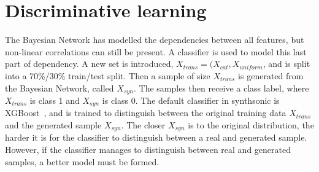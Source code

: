 \section{Discriminative learning}
The Bayesian Network has modelled the dependencies between all features, but non-linear correlations can still be present. A classifier is used to model this last part of dependency. A new set is introduced, $X_{trans} = (X_{cat},X_{uniform}$, and is split into a 70\%/30\% train/test split. Then a sample of size $X_{trans}$ is generated from the Bayesian Network, called $X_{syn}$. The samples then receive a class label, where $X_{trans}$ is class 1 and $X_{syn}$ is class 0. The default classifier in synthsonic is XGBoost~\cite{Chen2016XGBoost:System}, and is trained to distinguish between the original training data $X_{trans}$ and the generated sample $X_{syn}$. The closer $X_{syn}$ is to the original distribution, the harder it is for the classifier to distinguish between a real and generated sample. However, if the classifier manages to distinguish between real and generated samples, a better model must be formed. 


